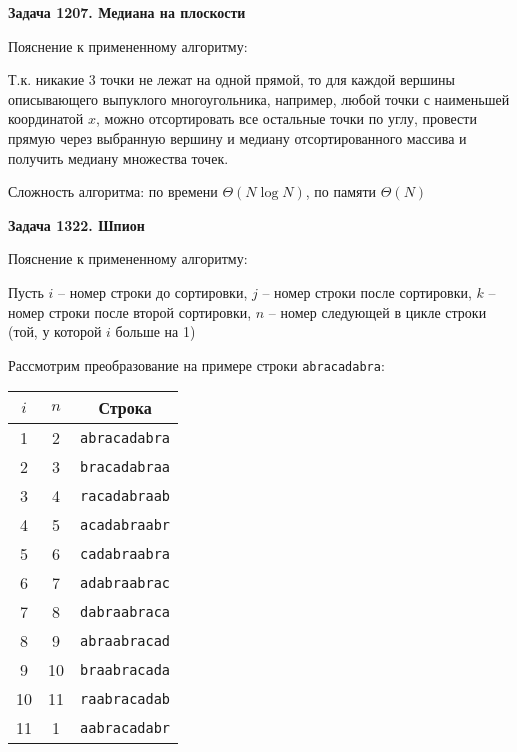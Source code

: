 \documentclass[12pt,a4paper]{article}
\begin{document}
    \newcommand{\LabNumber}{2}
    

    \textbf{Задача 1207. Медиана на плоскости}

    Пояснение к примененному алгоритму:

    Т.к. никакие 3 точки не лежат на одной прямой, то для каждой вершины описывающего выпуклого многоугольника,
    например, любой точки с наименьшей координатой $x$, можно отсортировать все остальные точки по углу,
    провести прямую через выбранную вершину и медиану отсортированного массива и получить медиану множества точек.

    Сложность алгоритма: по времени $\Theta(N\log N)$, по памяти $\Theta(N)$

    \bigskip

    \textbf{Задача 1322. Шпион}

    Пояснение к примененному алгоритму:

    Пусть
    $i$ -- номер строки до сортировки,
    $j$ -- номер строки после сортировки,
    $k$ -- номер строки после второй сортировки,
    $n$ -- номер следующей в цикле строки (той, у которой $i$ больше на 1)

    Рассмотрим преобразование на примере строки \texttt{abracadabra}:
    \begin{center}
        \begin{tabular}{c|c|c}
            $i$ & $n$& Строка \\ \hline
            1  & 2  & \texttt{abracadabra} \\
            2  & 3  & \texttt{bracadabraa} \\
            3  & 4  & \texttt{racadabraab} \\
            4  & 5  & \texttt{acadabraabr} \\
            5  & 6  & \texttt{cadabraabra} \\
            6  & 7  & \texttt{adabraabrac} \\
            7  & 8  & \texttt{dabraabraca} \\
            8  & 9  & \texttt{abraabracad} \\
            9  & 10 & \texttt{braabracada} \\
            10 & 11 & \texttt{raabracadab} \\
            11 & 1  & \texttt{aabracadabr} \\
        \end{tabular}
    \end{center}
    \bigskip
\end{document}
